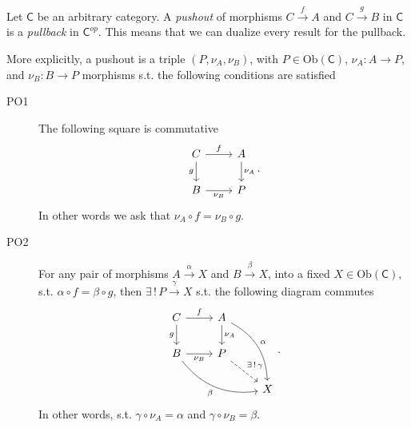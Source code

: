 \begin{defn}[Pushout]
	Let $\mathsf{C}$ be an arbitrary category.
	A {\em pushout} of morphisms $C \xrightarrow{f} A$ and $C \xrightarrow{g} B$ in $\mathsf{C}$ is a {\em pullback} in $\mathsf{C}^{op}$.
	This means that we can dualize every result for the pullback.

	More explicitly, a pushout is a triple $ \left(P, \nu_A, \nu_B \right)$, with $P \in \mathrm{Ob} \left(\mathsf{C}\right)$, $\nu_A\colon A \to P$,  and $\nu_B\colon B \to P$ morphisms s.t. the following conditions are satisfied
	\begin{description}
		\item[PO1] The following square is commutative
			\begin{equation}
			\begin{tikzcd}
				C \arrow[r, "f", rightarrow] \arrow[d, "g"', rightarrow] &
				A \arrow[d, "\nu_A", rightarrow] \\
				B \arrow[r, "\nu_B"', rightarrow] &
				P
			\end{tikzcd}
			.\end{equation} 
			In other words we ask that $\nu_A \circ f = \nu_B \circ g$.
		\item[PO2] For any pair of morphisms $A \xrightarrow{\alpha} X$ and $B \xrightarrow{\beta} X$, into a fixed $X \in \mathrm{Ob} \left(\mathsf{C}\right)$, s.t. $\alpha \circ f = \beta \circ g$, then
			$\exists\, !\, P \xrightarrow{\gamma} X$ s.t. the following diagram commutes
			\begin{equation}
			\begin{tikzcd}
				C \arrow[r, "f", rightarrow] \arrow[d, "g"', rightarrow] &
				A \arrow[d, "\nu_A", rightarrow] \arrow[rdd, "\alpha", rightarrow, bend left] & \\
				B \arrow[r, "\nu_B"', rightarrow] \arrow[rrd, "\beta"', rightarrow, bend right] &
				P \arrow[rd, "\exists\, !\, \gamma", dashrightarrow] & \\
				& & X
			\end{tikzcd}
			.\end{equation} 			
			In other words, s.t. $\gamma \circ \nu_A = \alpha$ and $\gamma \circ \nu_B = \beta$.
	\end{description} 
\end{defn}
		
